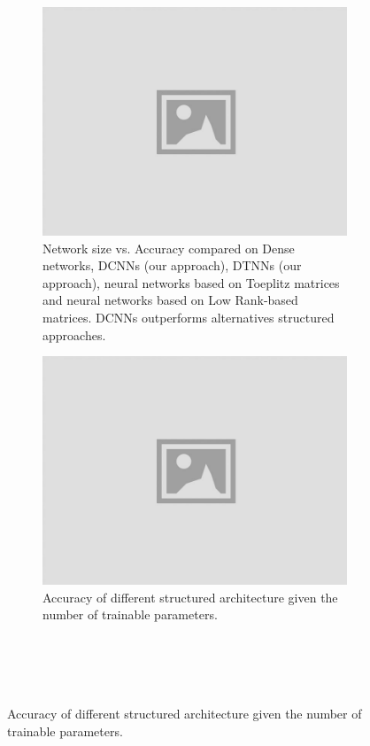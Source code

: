 \begin{figure}
   \centering
   \begin{subfigure}[b]{0.49\textwidth}
       \centering
       \includegraphics[width=\textwidth]{graphs/cifar10_type.jpg}
       \caption{Network size vs. Accuracy compared on Dense networks, DCNNs (our approach), DTNNs (our approach), neural networks based on Toeplitz matrices and neural networks based on Low Rank-based matrices. DCNNs outperforms alternatives structured approaches.}
       \label{figure:cifar10_type}
   \end{subfigure}
   \hfill
   \begin{subfigure}[b]{0.49\textwidth}
       \centering
       \includegraphics[width=\textwidth]{graphs/scatterplot.jpg}
       \caption{Accuracy of different structured architecture given the number of trainable parameters.~\\~\\~\\~\\~\\}
       \label{figure:cifar10_with_channels_xp}
   \end{subfigure}
\end{figure}





